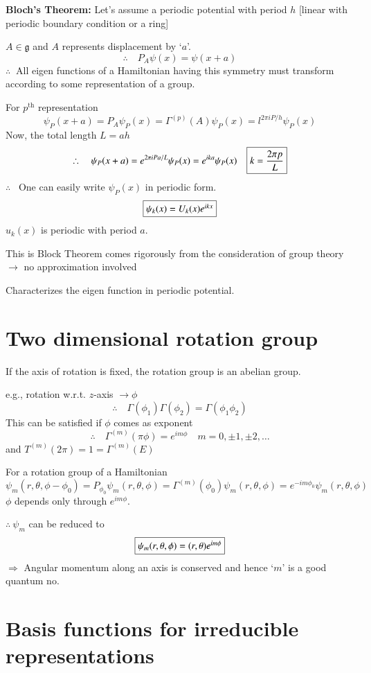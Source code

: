 \medskip
\noindent
{\bf Bloch's Theorem:} Let's assume a periodic potential with period $h$ [linear with periodic boundary condition or a ring]

$A\in \mathfrak{g}$ and $A$ represents displacement by `$a$'.
$$
\therefore\quad P_{A}\psi(x)=\psi(x+a)
$$
$\therefore \ $ All eigen functions of a Hamiltonian having this symmetry must transform according to some representation of a group.

For $p^{\text{th}}$ representation
$$
\psi_{P}(x+a)=P_{A}\psi_{P}(x)=\Gamma^{(p)}(A)\psi_{P}(x)=l^{2\pi iP/h}\psi_{P}(x)
$$
Now, the total length $L=ah$
$$
\therefore\quad \psi_{P}(x+a)=e^{2\pi iPa/L}\psi_{P}(x)=e^{ika}\psi_{P}(x)\quad \fbox{$k=\dfrac{2\pi p}{L}$}
$$
$\therefore$ \ One can easily write $\psi_{P}(x)$ in periodic form.
$$
\fbox{$\psi_{k}(x)=U_{k}(x)e^{ikx}$}
$$
$u_{k}(x)$ is periodic with period $a$.

This is Block Theorem comes rigorously from the consideration of group theory $\to$ no approximation involved

\smallskip


\smallskip

Characterizes the eigen function in periodic potential.

\section*{Two dimensional rotation group}

If the axis of rotation is fixed, the rotation group is an abelian group.

e.g., rotation w.r.t. $z$-axis $\to \phi$
$$
\therefore\quad \Gamma(\phi_{1})\Gamma(\phi_{2})=\Gamma(\phi_{1}\phi_{2})
$$
This can be satisfied if $\phi$ comes as exponent 
$$
\therefore\quad \Gamma^{(m)}(\pi \phi)=e^{im\phi}\quad m=0,\pm 1,\pm 2,\ldots
$$
and $T^{(m)}(2\pi)=1=\Gamma^{(m)}(E)$

For a rotation group of a Hamiltonian
$$
\psi_{m}(r,\theta,\phi-\phi_{0})=P_{\phi_{0}}\psi_{m}(r,\theta,\phi)=\Gamma^{(m)}(\phi_{0})\psi_{m}(r,\theta,\phi)=e^{-im\phi_{0}}\psi_{m}(r,\theta,\phi)
$$
$\phi$ depends only through $e^{im\phi}$.

$\therefore \ \psi_{m}$ can be reduced to
$$
\fbox{$\psi_{m}(r,\theta,\phi)=(r,\theta)e^{im\phi}$}
$$
$\Rightarrow$ Angular momentum along an axis is conserved and hence `$m$' is a good quantum no.

\section*{Basis functions for irreducible representations}

